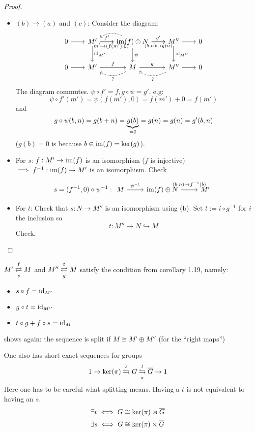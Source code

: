 \documentclass[a4paper]{report}
\begin{document}
\begin{thm-defi}
\begin{proof}
\begin{itemize}
      \item $(b) \to (a)$ and $(c)$: Consider the diagram:
            \[
\begin{tikzcd}[column sep= 20, row sep = 20]
0 \arrow[r] & M' \arrow[r, "f'"] \arrow[d, "\id_{M'}"] \arrow[r, "{\small \ \ \ \ m' \mps (f(m'),0)}"'] & \im(f) \oplus N \arrow[r, "g'"] \arrow[d, "\psi"] \arrow[l, dashed, bend right] \arrow[r, "{\small (b,n) \mps g(n)}"'] & M'' \arrow[r] \arrow[d, "\id_{M''}"]            & 0 \\
0 \arrow[r] & M' \arrow[r, "f"]                                                                 & M \arrow[r, "g"] \arrow[l, "?", dashed, bend left]                                                                     & M'' \arrow[r] \arrow[l, "?", dashed, bend left] & 0
\end{tikzcd}
            \]
            The diagram commutes. $\psi \circ f' = f, g \circ \psi = g'$, e.g: \[\psi \circ f'(m') = \psi(f(m'), 0) = f(m') + 0 = f(m')\] and
            \[g \circ \psi(b,n) = g(b+n) = \underbrace{g(b)}_{=0} = g(n) = g(n) = g'(b,n)\]
            ($g(b) = 0$ is because $b \in \operatorname{im}(f) = \ker(g)$).

      \item For $s$: $f: M' \to \operatorname{im}(f)$ is an isomorphism ($f$ is injective) $\implies f^{-1}: \operatorname{im}(f) \to M'$ is an isomorphism. Check
            \[s = (f^{-1},0) \circ \psi^{-1}: \begin{tikzcd}[row sep = 30]
M \arrow[r, "\psi^{-1}"] & \im(f) \oplus N \arrow[r, "{\begin{matrix}(b,n) \mps f^{-1}(b) \\ \end{matrix}}"] & M'
\end{tikzcd}\]
      \item For $t$: Check that $s : N \to M''$ is an isomorphism using (b). Set $t:= i \circ g^{-1}$ for $i$ the inclusion so \[t: M'' \to N \hookrightarrow M\]Check. \qedhere
\end{itemize}
  \end{proof}
\end{thm-defi}
\begin{rem*}
  $M' \overunderset fs \rightleftarrows M $ and $M'' \overunderset tg \rightleftarrows M $ satisfy the condition from corollary 1.19, namely:
  \begin{itemize}
    \item $s \circ f = \operatorname{id}_{M'}$
    \item $g \circ t = \operatorname{id}_{M''}$
    \item $t \circ g + f \circ s = \operatorname{id}_{M}$
  \end{itemize}
  shows again: the sequence is split if $M \cong M' \oplus M''$ (for the ``right maps'')
\end{rem*}
\begin{rem*}
  One also has short exact sequences for groups
  \[1 \to \ker(\pi) \overset s \leftrightarrows G \overunderset t \pi \leftrightarrows \bar G \to 1\]
  Here one has to be careful what splitting means. Having a $t$ is not equivalent to having an $s$.
  \[\exists t \iff G \cong \ker(\pi) \rtimes \overline G\]
  \[\exists s \iff G \cong \ker(\pi) \times \overline G\]
\end{rem*}
\end{document}

